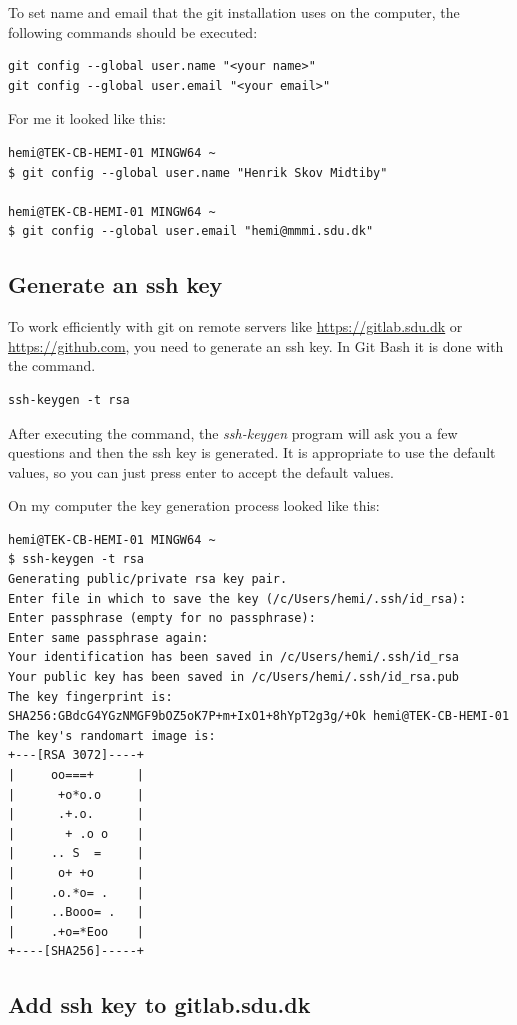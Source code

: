 \documentclass[12pt,a4paper]{article}
\newcounter{ex}
\numberwithin{ex}{section}
\begin{document}
To set name and email that the git installation uses on the 
computer, the following commands should be executed:
\begin{verbatim}
git config --global user.name "<your name>"
git config --global user.email "<your email>"
\end{verbatim}

For me it looked like this:
\begin{verbatim}
hemi@TEK-CB-HEMI-01 MINGW64 ~
$ git config --global user.name "Henrik Skov Midtiby"

hemi@TEK-CB-HEMI-01 MINGW64 ~
$ git config --global user.email "hemi@mmmi.sdu.dk"
\end{verbatim}

\subsection{Generate an ssh key}

To work efficiently with git on remote servers like \url{https://gitlab.sdu.dk} or \url{https://github.com}, you need to generate 
an ssh key.
In Git Bash it is done with the command.
\begin{verbatim}
ssh-keygen -t rsa
\end{verbatim}
After executing the command, the \emph{ssh-keygen} program
will ask you a few questions and then the ssh key is generated.
It is appropriate to use the default values, so you can just 
press enter to accept the default values.

On my computer the key generation process looked like this:
\begin{verbatim}
hemi@TEK-CB-HEMI-01 MINGW64 ~
$ ssh-keygen -t rsa
Generating public/private rsa key pair.
Enter file in which to save the key (/c/Users/hemi/.ssh/id_rsa):
Enter passphrase (empty for no passphrase):
Enter same passphrase again:
Your identification has been saved in /c/Users/hemi/.ssh/id_rsa
Your public key has been saved in /c/Users/hemi/.ssh/id_rsa.pub
The key fingerprint is:
SHA256:GBdcG4YGzNMGF9bOZ5oK7P+m+IxO1+8hYpT2g3g/+Ok hemi@TEK-CB-HEMI-01
The key's randomart image is:
+---[RSA 3072]----+
|     oo===+      |
|      +o*o.o     |
|      .+.o.      |
|       + .o o    |
|     .. S  =     |
|      o+ +o      |
|     .o.*o= .    |
|     ..Booo= .   |
|     .+o=*Eoo    |
+----[SHA256]-----+
\end{verbatim}

\subsection{Add ssh key to gitlab.sdu.dk}
\end{document}
